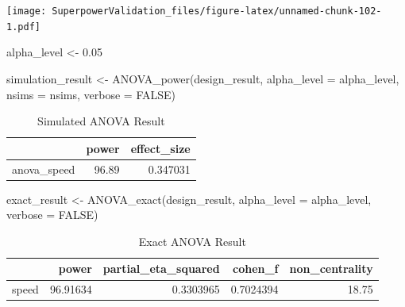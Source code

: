 \documentclass[
]{book}
\newenvironment{Shaded}{\begin{snugshade}}{\end{snugshade}}
\newcommand{\AttributeTok}[1]{\textcolor[rgb]{0.77,0.63,0.00}{#1}}
\newcommand{\ConstantTok}[1]{\textcolor[rgb]{0.00,0.00,0.00}{#1}}
\newcommand{\FloatTok}[1]{\textcolor[rgb]{0.00,0.00,0.81}{#1}}
\newcommand{\FunctionTok}[1]{\textcolor[rgb]{0.00,0.00,0.00}{#1}}
\newcommand{\NormalTok}[1]{#1}
\newcommand{\OtherTok}[1]{\textcolor[rgb]{0.56,0.35,0.01}{#1}}
\begin{document}
\texttt{[image: SuperpowerValidation\_files/figure-latex/unnamed-chunk-102-1.pdf]}

\begin{Shaded}
\begin{Highlighting}[]
\NormalTok{alpha\_level }\OtherTok{\textless{}{-}} \FloatTok{0.05}
\end{Highlighting}
\end{Shaded}

\begin{Shaded}
\begin{Highlighting}[]
\NormalTok{simulation\_result }\OtherTok{\textless{}{-}} \FunctionTok{ANOVA\_power}\NormalTok{(design\_result, }
                                 \AttributeTok{alpha\_level =}\NormalTok{ alpha\_level, }
                                 \AttributeTok{nsims =}\NormalTok{ nsims,}
                                 \AttributeTok{verbose =} \ConstantTok{FALSE}\NormalTok{)}
\end{Highlighting}
\end{Shaded}

\begin{table}[!h]

\caption{\label{tab:unnamed-chunk-104}Simulated ANOVA Result}
\centering
\begin{tabular}[t]{l|r|r}
\hline
  & power & effect\_size\\
\hline
anova\_speed & 96.89 & 0.347031\\
\hline
\end{tabular}
\end{table}

\begin{Shaded}
\begin{Highlighting}[]
\NormalTok{exact\_result }\OtherTok{\textless{}{-}} \FunctionTok{ANOVA\_exact}\NormalTok{(design\_result,}
                            \AttributeTok{alpha\_level =}\NormalTok{ alpha\_level,}
                            \AttributeTok{verbose =} \ConstantTok{FALSE}\NormalTok{)}
\end{Highlighting}
\end{Shaded}

\begin{table}[!h]

\caption{\label{tab:unnamed-chunk-106}Exact ANOVA Result}
\centering
\begin{tabular}[t]{l|r|r|r|r}
\hline
  & power & partial\_eta\_squared & cohen\_f & non\_centrality\\
\hline
speed & 96.91634 & 0.3303965 & 0.7024394 & 18.75\\
\hline
\end{tabular}
\end{table}
\end{document}
